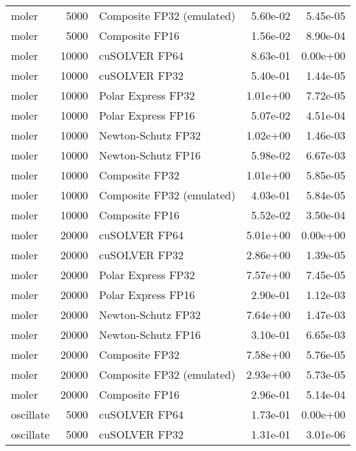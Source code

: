 \begin{table}
\begin{tabular}{lrlrr}
    moler &  5000 & Composite FP32 (emulated) &  5.60e-02 &        5.45e-05 \\
    moler &  5000 &            Composite FP16 &  1.56e-02 &        8.90e-04 \\
    moler & 10000 &             cuSOLVER FP64 &  8.63e-01 &        0.00e+00 \\
    moler & 10000 &             cuSOLVER FP32 &  5.40e-01 &        1.44e-05 \\
    moler & 10000 &        Polar Express FP32 &  1.01e+00 &        7.72e-05 \\
    moler & 10000 &        Polar Express FP16 &  5.07e-02 &        4.51e-04 \\
    moler & 10000 &        Newton-Schutz FP32 &  1.02e+00 &        1.46e-03 \\
    moler & 10000 &        Newton-Schutz FP16 &  5.98e-02 &        6.67e-03 \\
    moler & 10000 &            Composite FP32 &  1.01e+00 &        5.85e-05 \\
    moler & 10000 & Composite FP32 (emulated) &  4.03e-01 &        5.84e-05 \\
    moler & 10000 &            Composite FP16 &  5.52e-02 &        3.50e-04 \\
    moler & 20000 &             cuSOLVER FP64 &  5.01e+00 &        0.00e+00 \\
    moler & 20000 &             cuSOLVER FP32 &  2.86e+00 &        1.39e-05 \\
    moler & 20000 &        Polar Express FP32 &  7.57e+00 &        7.45e-05 \\
    moler & 20000 &        Polar Express FP16 &  2.90e-01 &        1.12e-03 \\
    moler & 20000 &        Newton-Schutz FP32 &  7.64e+00 &        1.47e-03 \\
    moler & 20000 &        Newton-Schutz FP16 &  3.10e-01 &        6.65e-03 \\
    moler & 20000 &            Composite FP32 &  7.58e+00 &        5.76e-05 \\
    moler & 20000 & Composite FP32 (emulated) &  2.93e+00 &        5.73e-05 \\
    moler & 20000 &            Composite FP16 &  2.96e-01 &        5.14e-04 \\
oscillate &  5000 &             cuSOLVER FP64 &  1.73e-01 &        0.00e+00 \\
oscillate &  5000 &             cuSOLVER FP32 &  1.31e-01 &        3.01e-06 \\

\end{tabular}
\end{table}
